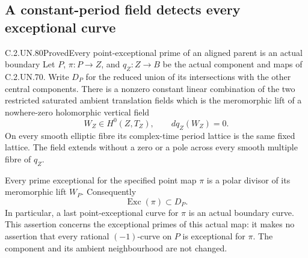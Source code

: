 \subsection{A constant-period field detects every exceptional curve}

\begin{statement}{C.2.UN.80}{Proved}{Every point-exceptional prime of an aligned parent is an actual boundary}
Let \(P\), \(\pi:P\to Z\), and \(q_Z:Z\to B\) be the
actual component and maps of C.2.UN.70. Write \(D_P\)
for the reduced union of its intersections with the
other central components. There is a nonzero constant
linear combination of the two restricted saturated
ambient translation fields which is the meromorphic
lift of a nowhere-zero holomorphic vertical field
\[
 W_Z\in H^0(Z,T_Z),\qquad dq_Z(W_Z)=0.
 \tag{C.EP.1}
\]
On every smooth elliptic fibre its complex-time period
lattice is the same fixed lattice. The field extends
without a zero or a pole across every smooth multiple
fibre of \(q_Z\).

Every prime exceptional for the specified point map
\(\pi\) is a polar divisor of its meromorphic lift
\(W_P\). Consequently
\[
                 \operatorname{Exc}(\pi)\subset D_P.
 \tag{C.EP.2}
\]
In particular, a last point-exceptional curve for
\(\pi\) is an actual boundary curve. This assertion
concerns the exceptional primes of this actual map:
it makes no assertion that every rational
\((-1)\)-curve on \(P\) is exceptional for \(\pi\).
The component and its ambient neighbourhood are not
changed.
\end{statement}

